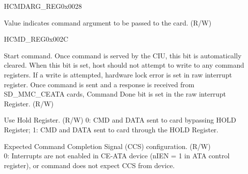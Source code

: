 \begin{register}{H}{CMDARG\_REG}{0x0028}\label{regdesc:CMDARGREG}
%
\regnewline%
\begin{regdesc}\begin{reglist}
\item [CMDARG\_REG]Value indicates command argument to be passed to the card. (R/W)
\end{reglist}\end{regdesc}
\end{register}


\begin{register}{H}{CMD\_REG}{0x002C}\label{regdesc:CMDREG}
%
%
%
%
%
%
%
%
%
%
%
%
%
%
%
%
%
%
%
%
%
%
%
\regnewline%
\begin{regdesc}\begin{reglist}
\item [START\_CMD]Start command. Once command is served by the CIU, this bit is automatically cleared. When this bit is set, host should not attempt to write to any command registers. If a write is attempted, hardware lock error is set in raw interrupt register. Once command is sent and a response is received from SD\_MMC\_CEATA cards, Command Done bit is set in the raw interrupt Register. (R/W)
\item [USE\_HOLE]Use Hold Register. (R/W) 0: CMD and DATA sent to card bypassing HOLD Register; 1: CMD and DATA sent to card through the HOLD Register. \\
\item [CCS\_EXPECTED] Expected Command Completion Signal (CCS) configuration. (R/W)\\
0: Interrupts are not enabled in CE-ATA device (nIEN = 1 in ATA control register), or command does not expect CCS from device.\\

\end{reglist}
\end{regdesc}
\end{register}
